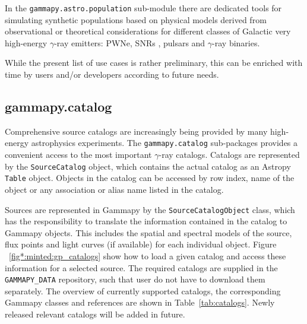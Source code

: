 \documentclass[longauth]{aa}
\newcommand{\code}[1]{\texttt{#1}}
\newcommand{\gammapy}{Gammapy\xspace}
\newcommand{\gammaray}{$\gamma$-ray\xspace}
\begin{document}
In the \code{gammapy.astro.population} sub-module there are dedicated tools
for simulating synthetic populations based on physical models derived from
observational or theoretical considerations for different classes of Galactic
very high-energy \gammaray emitters: PWNe, SNRs \cite{1998ApJ...504..761C},
pulsars \cite{2006ApJ...643..332F, 2006MNRAS.372..777L, 2004A&A...422..545Y}
and \gammaray binaries.

While the present list of use cases is rather preliminary, this can be enriched
with time by users and/or developers according to future needs.

\subsection{gammapy.catalog}
\label{ssec:gammapy-catalog}
Comprehensive source catalogs are increasingly being provided by many high-energy
astrophysics experiments. The \code{gammapy.catalog} sub-packages
provides a convenient access to the most important \gammaray catalogs.
Catalogs are represented by the \code{SourceCatalog} object, which
contains the actual catalog as an Astropy \code{Table} object.
Objects in the catalog can be accessed by row index, name of the
object or any association or alias name listed in the catalog.

Sources are represented in \gammapy by the \code{SourceCatalogObject}
class, which has the responsibility to translate the information
contained in the catalog to \gammapy objects. This includes
the spatial and spectral models of the source, flux points and
light curves (if available) for each individual object. 
Figure ~\ref{fig*:minted:gp_catalogs}
show how to load a given catalog and access these information for a selected source.
The required catalogs are supplied in the \code{GAMMAPY\_DATA} repository, such that 
user do not have to download them separately.
The overview of currently supported catalogs, the corresponding
\gammapy classes and references are shown in Table~\ref{tab:catalogs}.
Newly released relevant catalogs will be added in future.
\end{document}
